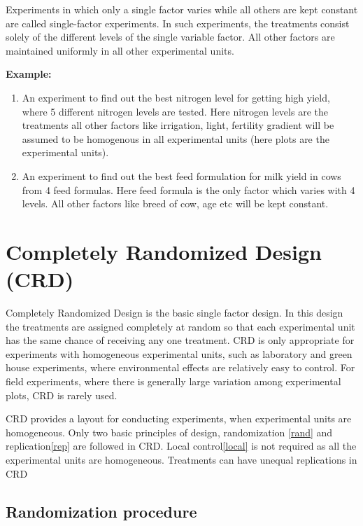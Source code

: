\documentclass[
]{book}
\begin{document}
Experiments in which only a single factor varies while all others are kept constant are called single-factor experiments. In such experiments, the treatments consist solely of the different levels of the single variable factor. All other factors are maintained uniformly in all other experimental units.

\textbf{Example:}

\begin{enumerate}
\def\labelenumi{\arabic{enumi}.}
\item
  An experiment to find out the best nitrogen level for getting high yield, where 5 different nitrogen levels are tested. Here nitrogen levels are the treatments all other factors like irrigation, light, fertility gradient will be assumed to be homogenous in all experimental units (here plots are the experimental units).
\item
  An experiment to find out the best feed formulation for milk yield in cows from 4 feed formulas. Here feed formula is the only factor which varies with 4 levels. All other factors like breed of cow, age etc will be kept constant.
\end{enumerate}

\hypertarget{crd}{%
\section{Completely Randomized Design (CRD)}\label{crd}}

Completely Randomized Design is the basic single factor design. In this
design the treatments are assigned completely at random so that each
experimental unit has the same chance of receiving any one treatment.
CRD is only appropriate for experiments with homogeneous experimental
units, such as laboratory and green house experiments, where
environmental effects are relatively easy to control. For field
experiments, where there is generally large variation among experimental
plots, CRD is rarely used.

CRD provides a layout for conducting experiments, when experimental
units are homogeneous. Only two basic principles of design,
randomization \ref{rand} and replication\ref{rep} are followed in
CRD. Local control\ref{local} is not required as all the experimental
units are homogeneous. Treatments can have unequal replications in CRD

\hypertarget{random1}{%
\subsection{Randomization procedure}\label{random1}}
\end{document}
